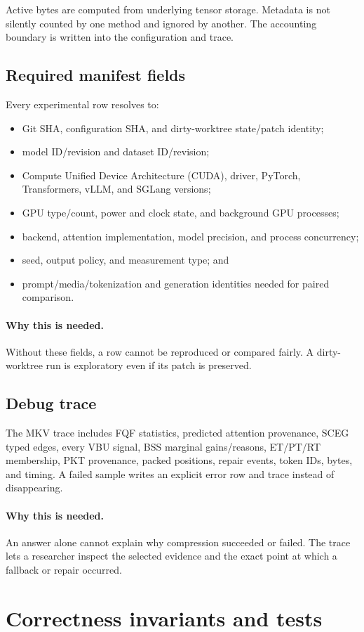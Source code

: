 \documentclass[11pt]{article}
\newcommand{\why}{\paragraph{Why this is needed.}}
\begin{document}
Active bytes are computed from underlying tensor storage. Metadata is not silently counted by one
method and ignored by another. The accounting boundary is written into the configuration and
trace.

\subsection{Required manifest fields}

Every experimental row resolves to:

\begin{itemize}
  \item Git SHA, configuration SHA, and dirty-worktree state/patch identity;
  \item model ID/revision and dataset ID/revision;
  \item Compute Unified Device Architecture (CUDA), driver, PyTorch, Transformers, vLLM, and
        SGLang versions;
  \item GPU type/count, power and clock state, and background GPU processes;
  \item backend, attention implementation, model precision, and process concurrency;
  \item seed, output policy, and measurement type; and
  \item prompt/media/tokenization and generation identities needed for paired comparison.
\end{itemize}

\why Without these fields, a row cannot be reproduced or compared fairly. A dirty-worktree run is
exploratory even if its patch is preserved.

\subsection{Debug trace}

The MKV trace includes FQF statistics, predicted attention provenance, SCEG typed edges, every VBU
signal, BSS marginal gains/reasons, ET/PT/RT membership, PKT provenance, packed positions,
repair events, token IDs, bytes, and timing. A failed sample writes an explicit error row and trace
instead of disappearing.

\why An answer alone cannot explain why compression succeeded or failed. The trace lets a
researcher inspect the selected evidence and the exact point at which a fallback or repair occurred.

\section{Correctness invariants and tests}
\label{sec:tests}
\end{document}
